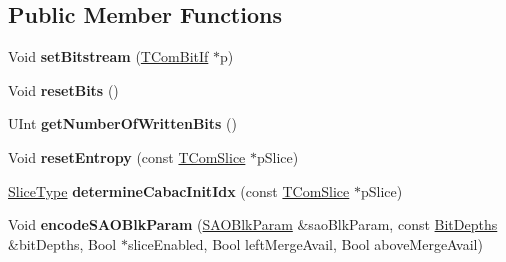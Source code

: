 \subsection*{Public Member Functions}
\begin{DoxyCompactItemize}
\item 
\mbox{\label{class_t_enc_entropy_ac2a90ef01fb81966c2e0e7a66f0de8c7}} 
Void {\bfseries set\+Bitstream} (\hyperlink{class_t_com_bit_if}{T\+Com\+Bit\+If} $\ast$p)
\item 
\mbox{\label{class_t_enc_entropy_ad753a16a2a5188687705a4b9768f5a81}} 
Void {\bfseries reset\+Bits} ()
\item 
\mbox{\label{class_t_enc_entropy_af5d51627954ea4930bd7f3cd8e6cf000}} 
U\+Int {\bfseries get\+Number\+Of\+Written\+Bits} ()
\item 
\mbox{\label{class_t_enc_entropy_ac6fa283d8b471eb7e1bc957c4f59bf42}} 
Void {\bfseries reset\+Entropy} (const \hyperlink{class_t_com_slice}{T\+Com\+Slice} $\ast$p\+Slice)
\item 
\mbox{\label{class_t_enc_entropy_a0135c52bebcbb25dd860a30b43e5d1e0}} 
\hyperlink{_type_def_8h_a8fc5fd31653a387f7430d29863620f71}{Slice\+Type} {\bfseries determine\+Cabac\+Init\+Idx} (const \hyperlink{class_t_com_slice}{T\+Com\+Slice} $\ast$p\+Slice)
\item 
\mbox{\label{class_t_enc_entropy_adf208f9df75b79e8dbeed3f4215cdc91}} 
Void {\bfseries encode\+S\+A\+O\+Blk\+Param} (\hyperlink{struct_s_a_o_blk_param}{S\+A\+O\+Blk\+Param} \&sao\+Blk\+Param, const \hyperlink{struct_bit_depths}{Bit\+Depths} \&bit\+Depths, Bool $\ast$slice\+Enabled, Bool left\+Merge\+Avail, Bool above\+Merge\+Avail)
\end{DoxyCompactItemize}
